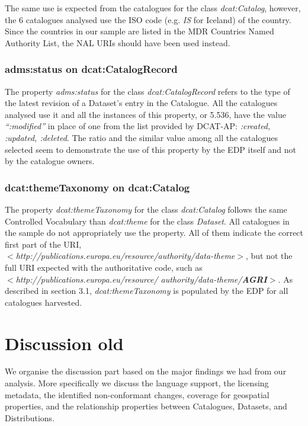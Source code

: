 \documentclass[<options>]{elsarticle}
\begin{document}
The same use is expected from the catalogues for the class \textit{dcat:Catalog}, however, the 6 catalogues analysed use the ISO code (e.g. \textit{IS} for Iceland) of the country.  Since the countries in our sample are listed in the MDR Countries Named Authority List, the NAL URIs should have been used instead.

\subsubsection{adms:status on dcat:CatalogRecord}
The property \textit{adms:status }for the class \textit{dcat:CatalogRecord} refers to the type of the latest revision of a Dataset's entry in the Catalogue. All the catalogues analysed use it and all the instances of this property, or 5.536, have the value \textit{“:modified”} in place of one from the list provided by DCAT-AP: \textit{:created, :updated, :deleted}. The ratio and the similar value among all the catalogues selected seem to demonstrate the use of this property by the EDP itself and not by the catalogue owners.

\subsubsection{dcat:themeTaxonomy on dcat:Catalog}

The property \textit{dcat:themeTaxonomy} for the class \textit{dcat:Catalog} follows the same Controlled Vocabulary than \textit{dcat:theme} for the class \textit{Dataset}. All catalogues in the sample do not appropriately use the property. All of them indicate the correct first part of the URI, \\
\textit{$<$http://publications.europa.eu/resource/authority/data-theme$>$}, but not the full URI expected with the authoritative code, such as \\ \textit{$<$http://publications.europa.eu/resource/ authority/data-theme/\textbf{AGRI}$>$}. As described in section 3.1, \textit{dcat:themeTaxonomy} is populated by the EDP for all catalogues harvested.

\section{Discussion old}
We organise the discussion part based on the major findings we had from our analysis. More specifically we discuss the language support, the licensing metadata, the identified non-conformant changes, coverage for geospatial properties, and the relationship properties between Catalogues, Datasets, and Distributions.
\end{document}
